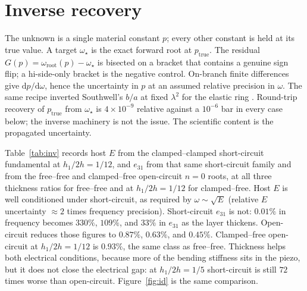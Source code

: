 \documentclass[11pt]{article}
\begin{document}
\FloatBarrier
\section{Inverse recovery}\label{sec:inverse}
The unknown is a single material constant $p$; every other constant is
held at its true value. A target $\omega_\star$ is the exact forward
root at $p_{\mathrm{true}}$. The residual
$G(p)=\omega_{\mathrm{root}}(p)-\omega_\star$ is bisected on a bracket
that contains a genuine sign flip; a hi-side-only bracket is the
negative control. On-branch finite differences give
$\mathrm{d}p/\mathrm{d}\omega$, hence the uncertainty in $p$ at an
assumed relative precision in $\omega$. The same recipe inverted
Southwell's $b/a$ at fixed $\lambda^2$ for the elastic ring
\cite{mccune2026ring}. Round-trip recovery of $p_{\mathrm{true}}$ from
$\omega_\star$ is $4\times10^{-9}$ relative against a $10^{-6}$ bar in
every case below; the inverse machinery is not the issue. The scientific
content is the propagated uncertainty.

Table~\ref{tab:inv} records host $E$ from the clamped--clamped
short-circuit fundamental at $h_1/2h=1/12$, and $e_{31}$ from that same
short-circuit family and from the free--free and clamped--free
open-circuit $n=0$ roots, at
all three thickness ratios for free--free and at $h_1/2h=1/12$ for
clamped--free. Host $E$ is well conditioned under
short-circuit, as required by $\omega\sim\sqrt{E}$ (relative $E$
uncertainty $\approx 2$ times frequency precision). Short-circuit
$e_{31}$ is not: $0.01\%$ in frequency becomes $330\%$, $109\%$, and
$33\%$ in $e_{31}$ as the layer thickens. Open-circuit reduces those
figures to $0.87\%$, $0.63\%$, and $0.45\%$. Clamped--free open-circuit
at $h_1/2h=1/12$ is $0.93\%$, the same class as free--free.
Thickness helps both
electrical conditions, because more of the bending stiffness sits in the
piezo, but it does not close the electrical gap: at $h_1/2h=1/5$
short-circuit is still $72$ times worse than open-circuit.
Figure~\ref{fig:id} is the same comparison.
\end{document}
